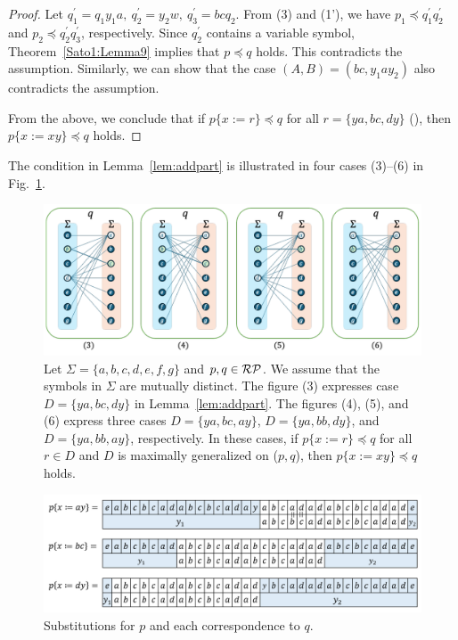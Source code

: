 \begin{proof}
  Let $q^{\prime}_{1}=q_{1}y_{1}a,~q^{\prime}_{2}=y_{2}w,~q^{\prime}_{3}=bcq_{2}$. From (3) and (1'), we have $p_{1} \preceq q^{\prime}_{1}q^{\prime}_{2}$ and $p_{2} \preceq q^{\prime}_{2}q^{\prime}_{3}$, respectively.
  Since $q_{2}^{\prime}$ contains a variable symbol, Theorem~\ref{Sato1:Lemma9} implies that $p \preceq q$ holds.
  This contradicts the assumption.
  Similarly, we can show that the case $(A, B) = (bc, y_{1}ay_{2})$ also contradicts the assumption.
  
  \smallskip
  
  From the above, we conclude that if $p \{ x := r \} \preceq q$ for all $r = \{ ya, bc, dy \}$ (\TheConditionA), then $p \{ x := xy \} \preceq q$ holds.
  \end{proof}

  The condition in Lemma~\ref{lem:addpart} is illustrated in four cases (3)--(6) in Fig.~\ref{fig:lem5bigraph}.

  \begin{figure}[t]
    \begin{center}
      \includegraphics[scale=0.525]{figs/lem5bigraph.pdf}
      \caption{Let $\Sigma=\{a,b,c,d,e,f,g\}$ and $p,q \in \mathcal{RP}$. We assume that the symbols in $\Sigma$ are mutually distinct. The figure (3) expresses case $D = \{ ya, bc, dy \}$ in Lemma~\ref{lem:addpart}.
      The figures (4), (5), and (6) express three cases $D = \{ ya, bc, ay \}$, $D = \{ ya, bb, dy \}$, and $D = \{ ya, bb, ay \}$, respectively.
      In these cases, if $p \{ x := r \} \preceq q$ for all $r \in D$ and $D$ is maximally generalized on ($p,q$), then $p \{ x := xy \} \preceq q$ holds.}\label{fig:lem5bigraph}
    \end{center}
  \end{figure}

\begin{figure}[t]
  \begin{center}
  \includegraphics[scale=0.45]{figs/Exam_b=a_c=d.png}
  \end{center}
  \caption{Substitutions for $p$ and each correspondence to $q$.}
  \label{fig:cex-bacd}
\end{figure}


